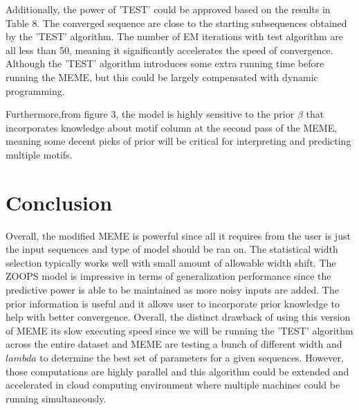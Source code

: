 \documentclass{article}
\begin{document}
Additionally, the power of 'TEST' could be approved based on the results in Table 8. The converged sequence are close to the starting subsequences obtained by the 'TEST' algorithm. The number of EM iterations with test algorithm are all less than 50, meaning it significantly accelerates the speed of convergence. Although the 'TEST' algorithm introduces some extra running time before running the MEME, but this could be largely compensated with dynamic programming. 

Furthermore,from figure 3, the model is highly sensitive to the prior $\beta$ that incorporates knowledge about motif column at the second pass of the MEME, meaning some decent picks of prior will be critical for interpreting and predicting multiple motifs.








\section{Conclusion}
Overall, the modified MEME is powerful since all it requires from the user is just the input sequences and type of model should be ran on. The statistical width selection typically works well with small amount of allowable width shift. The ZOOPS model is impressive in terms of generalization performance since the predictive power is able to be maintained as more noisy inputs are added. The prior information is useful and it allows user to incorporate prior knowledge to help with better convergence. Overall, the distinct drawback of using this version of MEME its slow executing speed since we will be running the 'TEST' algorithm across the entire dataset and MEME are testing a bunch of different width and $lambda$ to determine the best set of parameters for a given sequences. However, those computations are highly parallel and this algorithm could be extended and accelerated in cloud computing environment where multiple machines could be running simultaneously. 
\end{document}
